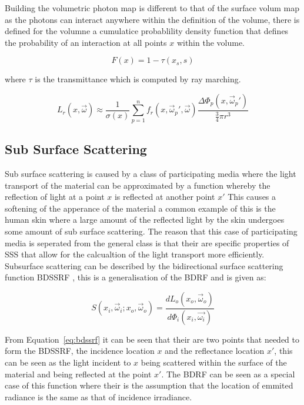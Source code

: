 Building the volumetric photon map is different to that of the surface volum map as the photons
can interact anywhere within the definition of the volume, there is defined for the volumne a
cumulatice probablility density function that defines the probability of an interaction at all
points $x$ within the volume.

\begin{equation}
F(x) = 1 - \tau(x_{s}, s)
\end{equation}

where $\tau$ is the transmittance which is computed by ray marching.

\begin{equation}
\label{eq:radiance_volumn_estimate}
L_{r}(x, \vec{\omega})
\approx
\frac
{1}
{\sigma(x)}
\sum_{p=1}^n
f_{r}(x,\vec{\omega}_{p}', \vec{\omega})
\frac
{
	\Delta\Phi_{p}(x, \vec{\omega}_{p}')
}
{
\frac{3}{4} \pi r^{3}
}
\end{equation}

\subsection{Sub Surface Scattering}
Sub surface scattering is caused by a class of participating media where the light transport of the
material can be approximated by a function whereby the reflection of light at a point $x$ is
reflected at another point $x'$ This causes a softening of the apperance of the material a common
example of this is the human skin where a large amount of the reflected light by the skin undergoes
some amount of sub surface scattering. The reason that this case of participating media is
seperated from the general class is that their are specific properties of SSS that allow for
the calcualtion of the light transport more efficiently. Subsurface scattering can be described by
the bidirectional surface scattering function BDSSRF \cite{Jensen01}, this is a generalisation of 
the BDRF and is given as:

\begin{equation}
\label{eq:bdssrf}
	S(x_{i}, \vec{\omega}_{i};x_{o}, \vec{\omega}_{o}) =
		\frac
		{ dL_{o}(x_{o},\vec{\omega}_o)}
		{d\Phi_{i}(x_{i}, \vec{\omega_{i}})}
\end{equation}

From Equation~\ref{eq:bdssrf} it can be seen that their are two points that needed to form the
BDSSRF, the incidence location $x$ and the reflectance location $x'$, this can be seen as the
light incident to $x$ being scattered within the surface of the material and being reflected at
the point $x'$. The BDRF can be seen as a special case of this function where their is the
assumption that the location of emmited radiance is the same as that of incidence irradiance.
